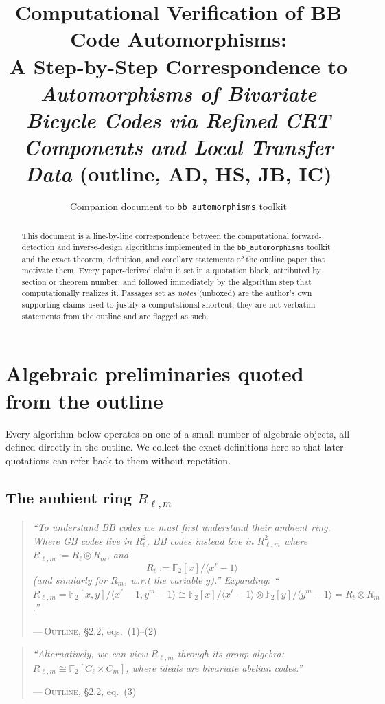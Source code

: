 \documentclass[11pt]{article}
\title{Computational Verification of BB Code Automorphisms:\\
\large A Step-by-Step Correspondence to\\
\textit{Automorphisms of Bivariate Bicycle Codes via Refined CRT\\
Components and Local Transfer Data} (outline, AD, HS, JB, IC)}
\author{Companion document to \texttt{bb\_automorphisms} toolkit}
\date{}
\theoremstyle{plain}
\theoremstyle{definition}
\newenvironment{paperquote}[1]{%
  \def\paperquotecite{#1}%
  \begin{quotation}\noindent\itshape\small
}{%
  \normalfont\par\hfill---\,\textsc{Outline}, \paperquotecite\medskip
  \end{quotation}
}
\newcommand{\pq}[2]{\begin{paperquote}{#1}#2\end{paperquote}}
\begin{document}
\maketitle

\begin{abstract}
This document is a line-by-line correspondence between the computational
forward-detection and inverse-design algorithms implemented in the
\texttt{bb\_automorphisms} toolkit and the exact theorem, definition, and
corollary statements of the outline paper that motivate them. Every
paper-derived claim is set in a quotation block, attributed by section or
theorem number, and followed immediately by the algorithm step that
computationally realizes it. Passages set as \emph{notes} (unboxed) are the
author's own supporting claims used to justify a computational shortcut;
they are not verbatim statements from the outline and are flagged as such.
\end{abstract}

\tableofcontents

\section{Algebraic preliminaries quoted from the outline}

Every algorithm below operates on one of a small number of algebraic
objects, all defined directly in the outline. We collect the exact
definitions here so that later quotations can refer back to them without
repetition.

\subsection{The ambient ring $R_{\ell,m}$}

\pq{\S2.2, eqs.\ (1)--(2)}{%
``To understand BB codes we must first understand their ambient ring. Where
GB codes live in $R_\ell^2$, BB codes instead live in $R_{\ell,m}^2$ where
$R_{\ell,m} := R_\ell \otimes R_m$, and
\[ R_\ell := \mathbb{F}_2[x]/\langle x^\ell - 1\rangle \]
(and similarly for $R_m$, w.r.t the variable $y$).''
Expanding: ``$R_{\ell,m} = \mathbb{F}_2[x,y]/\langle x^\ell-1,y^m-1\rangle
\cong \mathbb{F}_2[x]/\langle x^\ell-1\rangle \otimes
\mathbb{F}_2[y]/\langle y^m-1\rangle = R_\ell \otimes R_m$.''
}

\pq{\S2.2, eq.\ (3)}{%
``Alternatively, we can view $R_{\ell,m}$ through its group algebra:
$R_{\ell,m} \cong \mathbb{F}_2[C_\ell \times C_m]$, where ideals are
bivariate abelian codes.''
}
\end{document}

